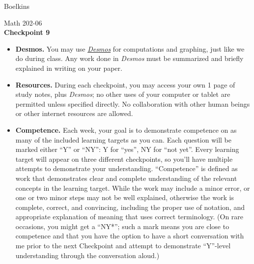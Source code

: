 \documentclass[11 pt]{article}
\begin{document}
 \hfill Boelkins \\
 
\begin{center}
Math 202-06 \\
{\bf Checkpoint 9}
\end{center}



\begin{itemize}
	
	\item {\bf Desmos.} You may use \href{https://www.desmos.com/calculator}{\emph{Desmos}} for computations and graphing, just like we do during class.  Any work done in \emph{Desmos} must be summarized and briefly explained in writing on your paper.  
	
	\item {\bf Resources.} During each checkpoint, you may access your own 1 page of study notes, plus \emph{Desmos}; no other uses of your computer or tablet are permitted unless specified directly.  No collaboration with other human beings or other internet resources are allowed.
	
	
	\item {\bf Competence.} Each week, your goal is to demonstrate competence on as many of the included learning targets as you can.  Each question will be marked either ``Y'' or ``NY'': Y for ``yes'', NY for ``not yet''.  Every learning target will appear on three different checkpoints, so you'll have multiple attempts to demonstrate your understanding.  ``Competence'' is defined as work that demonstrates clear and complete understanding of the relevant concepts in the learning target. While the work may include a minor error, or one or two minor steps may not be well explained, otherwise the work is complete, correct, and convincing, including the proper use of notation, and appropriate explanation of meaning that uses correct terminology.  (On rare occasions, you might get a ``NY*''; such a mark means you are close to competence and that you have the option to have a short conversation with me prior to the next Checkpoint and attempt to demonstrate ``Y''-level understanding through the conversation aloud.)	
\end{itemize}

\noindent \hrulefill \\
\end{document}
